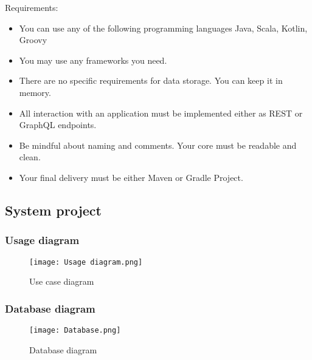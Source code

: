 \documentclass[12pt,a4paper]{article}
\begin{document}
Requirements:
\begin{itemize}
    \item
        You can use any of the following programming languages Java, Scala, Kotlin, Groovy
    \item
        You may use any frameworks you need.
    \item
        There are no specific requirements for data storage. You can keep it in
        memory.
    \item
        All interaction with an application must be implemented either as REST
        or GraphQL endpoints.
    \item
        Be mindful about naming and comments. Your core must be readable and
        clean.
    \item
        Your final delivery must be either Maven or Gradle Project.
\end{itemize}

\subsection{System project}
\subsubsection{Usage diagram}
\begin{figure}[htbp!]
    \begin{center}
        \texttt{[image: Usage diagram.png]}
    \end{center}
    \caption{Use case diagram}
\end{figure}

\subsubsection{Database diagram}
\begin{figure}[htbp!]
    \begin{center}
        \texttt{[image: Database.png]}
    \end{center}
    \caption{Database diagram}
\end{figure}
\pagebreak
\end{document}
